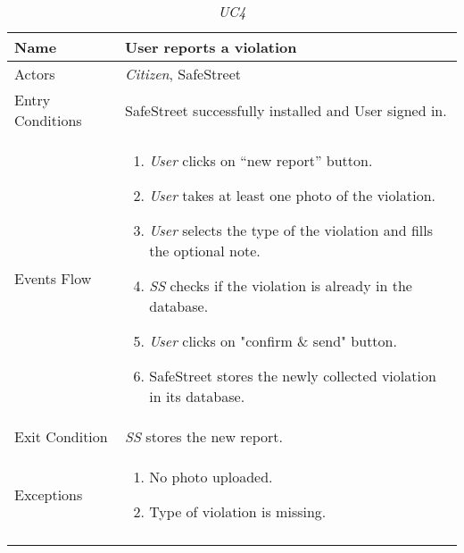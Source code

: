 \documentclass[../../../RASD.tex]{subfiles}
\begin{document}
    \begin{center}
        \begin{longtable}{| p{.35\linewidth} | p{.65\linewidth} |}
            \hline
            \textbf{Name} & \textbf{User reports a violation}\\ \hline
            Actors & \textit{Citizen}, SafeStreet\\ \hline
            Entry Conditions & SafeStreet successfully installed and User signed in.\\ \hline
            Events Flow &
            \begin{enumerate}
                \item \textit{User} clicks on “new report” button.
                \item \textit{User} takes at least one photo of the violation.
                \item \textit{User} selects the type of the violation and fills the optional note.
                \item \textit{SS} checks if the violation is already in the database.
                \item \textit{User} clicks on "confirm \& send" button.
                \item SafeStreet stores the newly collected violation in its database.
            \end{enumerate}
            \\ \hline
            Exit Condition & \textit{SS} stores the new report.\\ \hline
            Exceptions &
            \begin{enumerate}
                \item No photo uploaded.
                \item Type of violation is missing.
            \end{enumerate}
             \\
            \hline
            \caption{\textit{UC4}}
        \end{longtable}
    \end{center}
    \newpage
\end{document}
